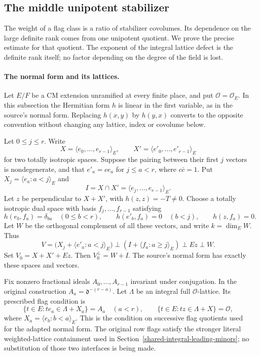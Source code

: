 \subsection{The middle unipotent stabilizer}
\label{sec:unipotent-stabilizer-covolume}

The weight of a flag class is a ratio of stabilizer covolumes.
Its dependence on the large definite rank comes from one
unipotent quotient.  We prove the precise estimate for that
quotient.  The exponent of the integral lattice defect is
the definite rank itself; no factor depending on the degree
of the field is lost.

\paragraph{The normal form and its lattices.}
Let $E/F$ be a CM extension unramified at every finite place,
and put $\mathcal O=\mathcal O_E$.  In this subsection the
Hermitian form $h$ is linear in the first variable, as in the
source's normal form.  Replacing $h(x,y)$ by $h(y,x)$ converts
to the opposite convention without changing any lattice,
index or covolume below.

Let $0\leq j\leq r$.  Write
\[
 X=\langle e_0,\ldots,e_{r-1}\rangle_E,\qquad
 X'=\langle e'_0,\ldots,e'_{r-1}\rangle_E
\]
for two totally isotropic spaces.  Suppose the pairing between
their first $j$ vectors is nondegenerate, and that
$e'_a=c e_a$ for $j\leq a<r$, where $c\bar c=1$.
Put $X_j=\langle e_a:a<j\rangle_E$ and
\[
 I=X\cap X'=\langle e_j,\ldots,e_{r-1}\rangle_E.
\]
Let $z$ be perpendicular to $X+X'$, with $h(z,z)=-T\ne0$.
Choose a totally isotropic dual space with basis
$f_j,\ldots,f_{r-1}$ satisfying
\[
 h(e_b,f_a)=\delta_{ba}\quad(0\leq b<r),\qquad
 h(e'_b,f_a)=0\quad(b<j),\qquad h(z,f_a)=0.
\]
Let $W$ be the orthogonal complement of all these vectors,
and write $k=\dim_E W$.  Thus
\[
 V=\bigl(X_j+\langle e'_a:a<j\rangle_E\bigr)
       \mathbin\perp(I+\langle f_a:a\geq j\rangle_E)
       \mathbin\perp Ez\mathbin\perp W.
 \tag{US1}
\]
Set $V_0=X+X'+Ez$.  Then $V_0^\perp=W+I$.
The source's normal form has exactly these spaces and vectors.
\cite{unipotent-stabilizer-source}

Fix nonzero fractional ideals $A_0,\ldots,A_{r-1}$ invariant
under conjugation.  In the original construction
$A_a=\mathfrak d^{-(r-a)}$.  Let $\Lambda$ be an integral
full $\mathcal O$-lattice.  Its prescribed flag condition is
\[
 \{t\in E:t e_a\in\Lambda+X_a\}=A_a\quad(a<r),
 \qquad \{t\in E:t z\in\Lambda+X\}=\mathcal O,
 \tag{US2}
\]
where $X_a=\langle e_b:b<a\rangle_E$.
This is the condition on successive flag quotients used for
the adapted normal form.  The original row flags satisfy the
stronger literal weighted-lattice containment used in
Section~\ref{shared-integral-leading-minors}; no substitution
of those two interfaces is being made.

